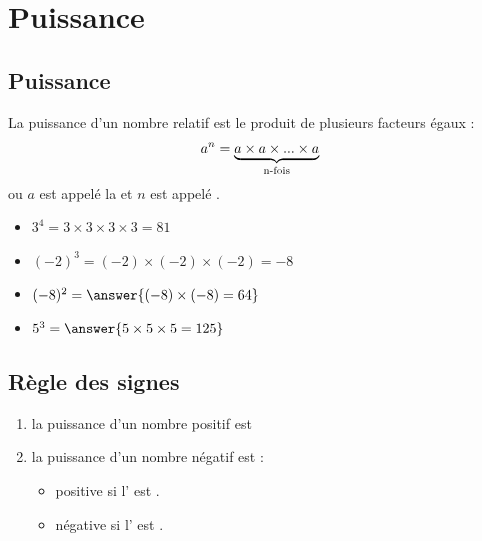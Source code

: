 \section{Puissance}
\subsection{Puissance}
\begin{definitionbox}
La puissance d’un nombre relatif est le produit de plusieurs facteurs égaux : 
$$ a^n = \underbrace{a\times a \times ... \times a}_{\text{\normalfont{n-fois}}}$$
ou $a$ est appelé la  et $n$ est appelé .
\end{definitionbox}

\begin{exemplebox}
    \begin{itemize}
        \item $3^4 = 3 \times 3\times 3\times 3 = 81$
        \item $(-2)^3 = (-2) \times (-2)\times (-2) = -8$
    \end{itemize}
\end{exemplebox}

\begin{exercicebox}
    \begin{itemize}
        \item $(-8)^2 = \answer{(-8) \times (-8) = 64}$
        \item $5^3 = \answer{5 \times 5\times 5 = 125}$
    \end{itemize}
\end{exercicebox}

\subsection{Règle des signes}
\begin{propbox}
\begin{enumerate}
    \item la puissance d'un nombre positif est 
    \item la puissance d'un nombre négatif est :
    \begin{itemize}
        \item positive si l' est .
        \item négative si l' est .
    \end{itemize}
\end{enumerate}
\end{propbox}
